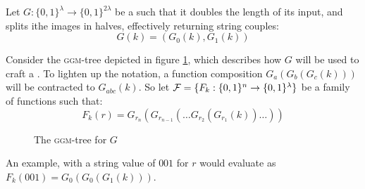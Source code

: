 \begin{construction}
    Let $G : \{0, 1\}^{\lambda} \to \{0, 1\}^{2\lambda} $ be a \prg{} such that it doubles the length of its input, and splits ithe images in halves, effectively returning string couples: 
    \[
        G(k)=(G_{0}(k), G_{1}(k))
    \]

    Consider the \textsc{ggm}-tree depicted in figure \ref{fig:ggmtree}, which describes how $G$ will be used to craft a \prf. To lighten up the notation, a function composition $G_a(G_b(G_c(k)))$ will be contracted to $G_{abc}(k)$. So let $\mathcal{F}=\{F_{k} : \{0, 1\}^n \to \{0, 1\}^\lambda\}$ be a family of functions such that:
    \[
        F_k(r)=G_{r_{n}}(G_{r_{n-1}}( \dots G_{r_2}(G_{r_1}(k)) \dots ))
    \]

    \begin{figure}[htbp]
        \centering
        \caption{The \textsc{ggm}-tree for $G$}
        \label{fig:ggmtree}
    \end{figure}

\end{construction}

An example, with a string value of $001$ for $r$ would evaluate as $F_k(001) = G_0(G_0(G_1(k)))$.

